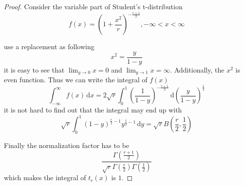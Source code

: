 \documentclass[a4paper]{article}
\begin{document}
\begin{proof}
    Consider the variable part of Student's t-distribution
    \begin{equation*}
        f(x) = (1+\frac{x^2}{r})^{-\frac{r+1}{2}}, -\infty < x < \infty
    \end{equation*}

    use a replacement as following
    \begin{equation*}
        x^2 = \frac{y}{1-y}
    \end{equation*}
    it is easy to see that $\lim_{y \to 0} x = 0$ and $\lim_{y \to 1} x = \infty$.
    Additionally, the $x^2$ is even function.
    Thus we can write the integral of $f(x)$
    \begin{equation*}
        \int_{-\infty}^{\infty} f(x) \,\mathrm{d}x =
        2 \sqrt{r} \int_{0}^{1} (\frac{1}{1-y})^{-\frac{r+1}{2}} \,\mathrm{d} (\frac{y}{1-y})^\frac{1}{2}
    \end{equation*}
    it is not hard to find out that the integral may end up with
    \begin{equation*}
        \sqrt{r} \int_{0}^{1} (1-y)^{\frac{r}{2}-1} y^{\frac{1}{2}-1} \,\mathrm{d}y =
        \sqrt{r} B(\frac{r}{2}, \frac{1}{2})
    \end{equation*}

    Finally the normalization factor has to be
    \begin{equation*}
        \frac{\Gamma(\frac{r+1}{2})}{\sqrt{r} \Gamma(\frac{r}{2}) \Gamma(\frac{1}{2})}
    \end{equation*}
    which makes the integral of $t_r(x)$ is $1$.

\end{proof}
\end{document}
